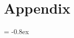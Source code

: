 
\chapter{Appendix} %

\label{AppendixA} %

	


\renewcommand{\arraystretch}{1.25}
\extrarowheight = -0.8ex




